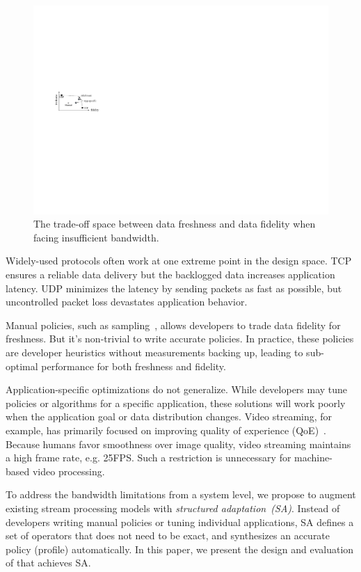 \begin{figure}
  \centering
  \includegraphics[width=0.9\linewidth]{figures/intro.pdf}
  \caption{The trade-off space between data freshness and data fidelity when
    facing insufficient bandwidth.}
  \label{fig:intro}
  \vspace{-1em}
\end{figure}

Widely-used protocols often work at one extreme point in the design space. TCP
ensures a reliable data delivery but the backlogged data increases application
latency. UDP minimizes the latency by sending packets as fast as possible, but
uncontrolled packet loss devastates application behavior.

Manual policies, such as sampling~\cite{rabkin2014aggregation}, allows
developers to trade data fidelity for freshness. But it's non-trivial to write
accurate policies. In practice, these policies are developer heuristics without
measurements backing up, leading to sub-optimal performance for both freshness
and fidelity.

Application-specific optimizations do not generalize. While developers may tune
policies or algorithms for a specific application, these solutions will work
poorly when the application goal or data distribution changes. Video streaming,
for example, has primarily focused on improving quality of experience
(QoE)~\cite{yin2015control}. Because humans favor smoothness over image quality,
video streaming maintains a high frame rate, e.g. 25FPS. Such a restriction is
unnecessary for machine-based video processing.

To address the bandwidth limitations from a system level, we propose to augment
existing stream processing models with \textit{structured
  adaptation~(SA)}. Instead of developers writing manual policies or tuning
individual applications, SA defines a set of operators that does not need to be
exact, and synthesizes an accurate policy (profile) automatically. In this
paper, we present the design and evaluation of \sysname{} that achieves SA.

